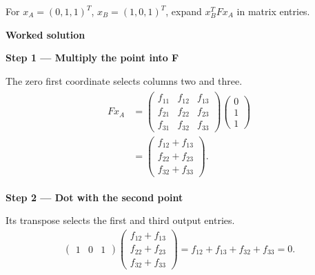 \documentclass[letterpaper,11pt,english,openany,oneside]{jupyterBook}
\begin{document}
\sphinxAtStartPar
For \(x_A=(0,1,1)^T\), \(x_B=(1,0,1)^T\), expand \(x_B^TFx_A\) in matrix entries.

\par\medskip

\par\medskip
\textbf{Worked solution}\par\smallskip

\par\medskip{}
{\color{QuizStepRed}\bfseries Step 1 — Multiply the point into F}\par\smallskip

\sphinxAtStartPar
{} The zero first coordinate selects columns two and three.
{\color{QuizMathBlue} \begin{equation*}
\begin{split}
\begin{aligned}Fx_A&=\begin{pmatrix}f_{11}&f_{12}&f_{13}\\f_{21}&f_{22}&f_{23}\\f_{31}&f_{32}&f_{33}\end{pmatrix}\begin{pmatrix}0\\1\\1\end{pmatrix}\\&=\begin{pmatrix}f_{12}+f_{13}\\f_{22}+f_{23}\\f_{32}+f_{33}\end{pmatrix}.\end{aligned}
\end{split}
\end{equation*}}
\par

\par\medskip{}
{\color{QuizStepRed}\bfseries Step 2 — Dot with the second point}\par\smallskip

\sphinxAtStartPar
{} Its transpose selects the first and third output entries.
{\color{QuizMathBlue} \begin{equation*}
\begin{split}
\begin{pmatrix}1&0&1\end{pmatrix}\begin{pmatrix}f_{12}+f_{13}\\f_{22}+f_{23}\\f_{32}+f_{33}\end{pmatrix}=f_{12}+f_{13}+f_{32}+f_{33}=0.
\end{split}
\end{equation*}}
\par
\end{document}
